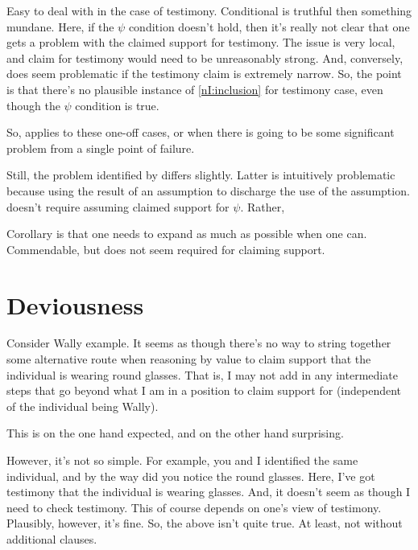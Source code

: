 \begin{note}
  Easy to deal with in the case of testimony.
  Conditional is truthful then something mundane.
  Here, if the \(\psi\) condition doesn't hold, then it's really not clear that one gets a problem with the claimed support for testimony.
  The issue is very local, and claim for testimony would need to be unreasonably strong.
  And, conversely, does seem problematic if the testimony claim is extremely narrow.
  So, the point is that there's no plausible instance of \ref{nI:inclusion} for testimony case, even though the \(\psi\) condition is true.

  So, \nI{} applies to these one-off cases, or when there is going to be some significant problem from a single point of failure.

  Still, the problem identified by \nI{} differs slightly.
  Latter is intuitively problematic because using the result of an assumption to discharge the use of the assumption.
  \nI{} doesn't require assuming claimed support for \(\psi\).
  Rather, 

  Corollary is that one needs to expand as much as possible when one can.
  Commendable, but does not seem required for claiming support.
\end{note}


\section{Deviousness}
\label{sec:deviousness}

\begin{note}
  Consider Wally example.
  It seems as though there's no way to string together some alternative route when reasoning by value to claim support that the individual is wearing round glasses.
  That is, I may not add in any intermediate steps that go beyond what I am in a position to claim support for (independent of the individual being Wally).

  This is on the one hand expected, and on the other hand surprising.

  However, it's not so simple.
  For example, you and I identified the same individual, and by the way did you notice the round glasses.
  Here, I've got testimony that the individual is wearing glasses.
  And, it doesn't seem as though I need to check testimony.
  This of course depends on one's view of testimony.
  Plausibly, however, it's fine.
  So, the above isn't quite true.
  At least, not without additional clauses.
\end{note}